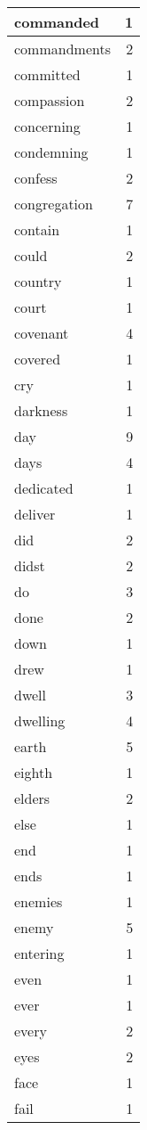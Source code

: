 \begin{center}
\begin{longtable}{l|r}
commanded & 1 \\ \hline
commandments & 2 \\ \hline
committed & 1 \\ \hline
compassion & 2 \\ \hline
concerning & 1 \\ \hline
condemning & 1 \\ \hline
confess & 2 \\ \hline
congregation & 7 \\ \hline
contain & 1 \\ \hline
could & 2 \\ \hline
country & 1 \\ \hline
court & 1 \\ \hline
covenant & 4 \\ \hline
covered & 1 \\ \hline
cry & 1 \\ \hline
darkness & 1 \\ \hline
day & 9 \\ \hline
days & 4 \\ \hline
dedicated & 1 \\ \hline
deliver & 1 \\ \hline
did & 2 \\ \hline
didst & 2 \\ \hline
do & 3 \\ \hline
done & 2 \\ \hline
down & 1 \\ \hline
drew & 1 \\ \hline
dwell & 3 \\ \hline
dwelling & 4 \\ \hline
earth & 5 \\ \hline
eighth & 1 \\ \hline
elders & 2 \\ \hline
else & 1 \\ \hline
end & 1 \\ \hline
ends & 1 \\ \hline
enemies & 1 \\ \hline
enemy & 5 \\ \hline
entering & 1 \\ \hline
even & 1 \\ \hline
ever & 1 \\ \hline
every & 2 \\ \hline
eyes & 2 \\ \hline
face & 1 \\ \hline
fail & 1 \\ \hline

\end{longtable}
\end{center}
